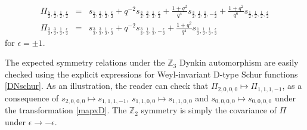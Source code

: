 \documentclass[12pt]{amsart}
\newcommand{\Z}{{\mathbb Z}}
\numberwithin{equation}{section}
\numberwithin{table}{section}
\begin{document}
\begin{appendix}
\begin{eqnarray*}
\Pi_{\frac{5}{2},\frac{1}{2},\frac{1}{2},\frac{\epsilon}{2}}&=&s_{\frac{5}{2},\frac{1}{2},\frac{1}{2},\frac{\epsilon}{2}}+q^{-2}s_{\frac{3}{2},\frac{3}{2},\frac{1}{2},\frac{\epsilon}{2}}+\frac{1+q^{2}}{q^4}s_{\frac{3}{2},\frac{1}{2},\frac{1}{2},-\frac{\epsilon}{2}}+\frac{1+q^2}{q^6}s_{\frac{1}{2},\frac{1}{2},\frac{1}{2},\frac{\epsilon}{2}}\\
\Pi_{\frac{3}{2},\frac{3}{2},\frac{1}{2},\frac{\epsilon}{2}}&=&s_{\frac{3}{2},\frac{3}{2},\frac{1}{2},\frac{\epsilon}{2}}+q^{-2}s_{\frac{3}{2},\frac{1}{2},\frac{1}{2},-\frac{\epsilon}{2}}+\frac{1+q^2}{q^4}s_{\frac{1}{2},\frac{1}{2},\frac{1}{2},\frac{\epsilon}{2}}
\end{eqnarray*}
for $\epsilon=\pm 1$.

The expected symmetry relations under the $\Z_3$ Dynkin automorphism are easily checked using the explicit expressions for Weyl-invariant D-type Schur functions \eqref{DNschur}. As an illustration, the reader can check that $\Pi_{2,0,0,0}\mapsto \Pi_{1,1,1,-1}$, as a consequence of $s_{2,0,0,0}\mapsto s_{1,1,1,-1}$,
$s_{1,1,0,0}\mapsto s_{1,1,0,0}$ and $s_{0,0,0,0}\mapsto s_{0,0,0,0}$ under the transformation \eqref{mapxD}. The $\Z_2$ symmetry is simply the covariance of $\Pi$ under $\epsilon\to-\epsilon$.


\end{appendix}




\end{document}
